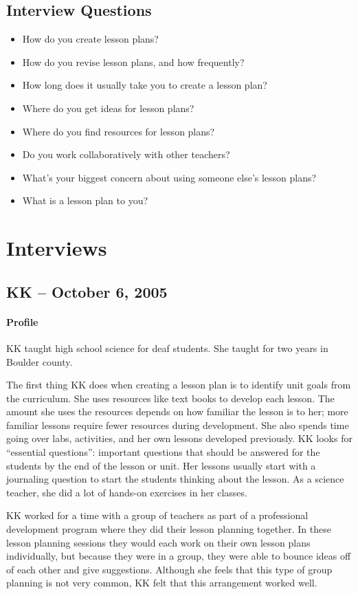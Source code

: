 \documentclass[12pt,titlepage]{article}
\begin{document}
\subsection{Interview Questions}
\begin{itemize}
	\item How do you create lesson plans?
	\item How do you revise lesson plans, and how frequently?
	\item How long does it usually take you to create a lesson plan?
	\item Where do you get ideas for lesson plans?
	\item Where do you find resources for lesson plans?
	\item Do you work collaboratively with other teachers?
	\item What's your biggest concern about using someone else's lesson plans?
	\item What is a lesson plan to you?
\end{itemize}

\section{Interviews}
\subsection{KK -- October 6, 2005}
\paragraph{Profile} KK taught high school science for deaf students. She taught
for two years in Boulder county.

The first thing KK does when creating a lesson plan is to identify unit goals from the
curriculum. She uses resources like text books to develop each lesson. The
amount she uses the resources depends on how familiar the lesson is to her; more
familiar lessons require fewer resources during development. She also spends
time going over labs, activities, and her own lessons developed previously. KK
looks for ``essential questions'': important questions that should be answered
for the students by the end of the lesson or unit. Her lessons usually start
with a journaling question to start the students thinking about the lesson. As
a science teacher, she did a lot of hands-on exercises in her classes.

KK worked for a time with a group of teachers as part of a professional
development program where they did their lesson planning together. In these
lesson planning sessions they would each work on their own lesson plans
individually, but because they were in a group, they were able to bounce ideas
off of each other and give suggestions. Although she feels that this type of
group planning is not very common, KK felt that this arrangement worked
well.
\end{document}
